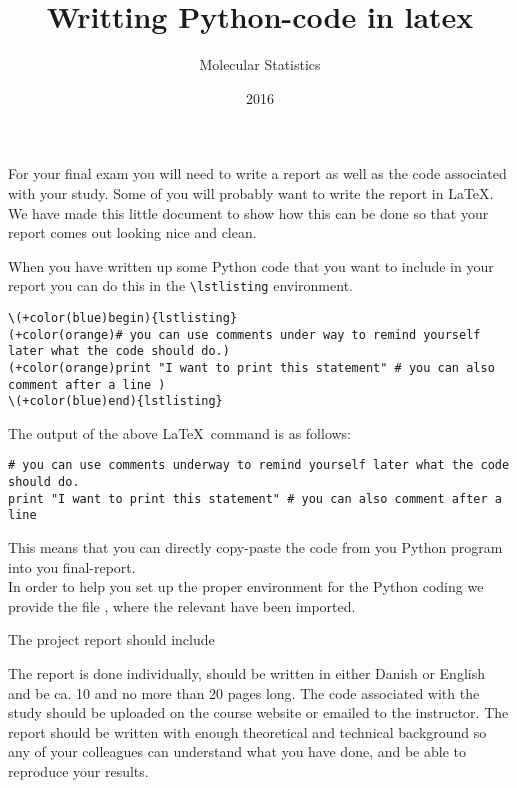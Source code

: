 \documentclass{article}
\title{Writting Python-code in latex}
\author{Molecular Statistics}
\date{2016}
\begin{document}
\maketitle\thispagestyle{fancy}


For your final exam you will need to write a report as well as the code associated with your study. 
Some of you will probably want to write the report in \LaTeX. 
We have made this little document to show how this can be done so that your report comes out looking nice and clean.

When you have written up some Python code that you want to include in your report you can do this in the \verb+\lstlisting+ environment.

\begin{Verbatim}[commandchars=+\(\)]
\(+color(blue)begin){lstlisting}
(+color(orange)# you can use comments under way to remind yourself later what the code should do.)
(+color(orange)print "I want to print this statement" # you can also comment after a line )
\(+color(blue)end){lstlisting}
\end{Verbatim}

The output of the above \LaTeX \ command is as follows:

\begin{lstlisting}
# you can use comments underway to remind yourself later what the code should do.
print "I want to print this statement" # you can also comment after a line
\end{lstlisting}

This means that you can directly copy-paste the code from you Python program into you final-report.\\

In order to help you set up the proper environment for the Python coding we provide the file , where the relevant  have been imported.\\

\begin{center}\large{The project report should include}\end{center}

The report is done individually, should be written in either Danish or English and be ca. 10
and no more than 20 pages long. The code associated with the study should be uploaded on the course
website or emailed to the instructor.
The report should be written with enough theoretical and technical background so any of your colleagues
can understand what you have done, and be able to reproduce your results.
\end{document}
